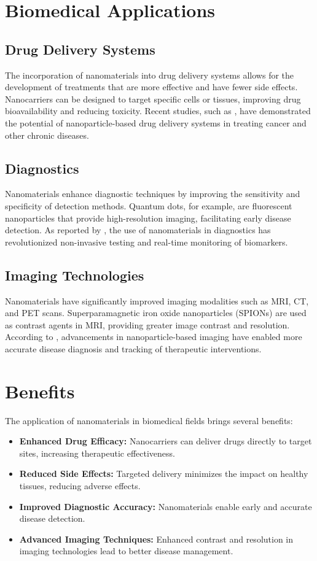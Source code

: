\documentclass[10pt]{article}
\begin{document}
\section{Biomedical Applications}

\subsection{Drug Delivery Systems}
The incorporation of nanomaterials into drug delivery systems allows for the development of treatments that are more effective and have fewer side effects. Nanocarriers can be designed to target specific cells or tissues, improving drug bioavailability and reducing toxicity. Recent studies, such as \cite{xyz2023}, have demonstrated the potential of nanoparticle-based drug delivery systems in treating cancer and other chronic diseases.

\subsection{Diagnostics}
Nanomaterials enhance diagnostic techniques by improving the sensitivity and specificity of detection methods. Quantum dots, for example, are fluorescent nanoparticles that provide high-resolution imaging, facilitating early disease detection. As reported by \cite{abc2022}, the use of nanomaterials in diagnostics has revolutionized non-invasive testing and real-time monitoring of biomarkers.

\subsection{Imaging Technologies}
Nanomaterials have significantly improved imaging modalities such as MRI, CT, and PET scans. Superparamagnetic iron oxide nanoparticles (SPIONs) are used as contrast agents in MRI, providing greater image contrast and resolution. According to \cite{def2023}, advancements in nanoparticle-based imaging have enabled more accurate disease diagnosis and tracking of therapeutic interventions.

\section{Benefits}
The application of nanomaterials in biomedical fields brings several benefits:
\begin{itemize}
    \item \textbf{Enhanced Drug Efficacy:} Nanocarriers can deliver drugs directly to target sites, increasing therapeutic effectiveness.
    \item \textbf{Reduced Side Effects:} Targeted delivery minimizes the impact on healthy tissues, reducing adverse effects.
    \item \textbf{Improved Diagnostic Accuracy:} Nanomaterials enable early and accurate disease detection.
    \item \textbf{Advanced Imaging Techniques:} Enhanced contrast and resolution in imaging technologies lead to better disease management.
\end{itemize}
\end{document}
